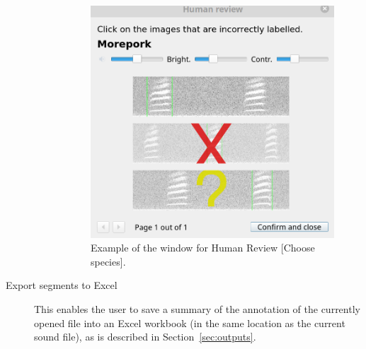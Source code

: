 \documentclass{article}
\begin{document}
\begin{description}
\begin{description}
	\begin{figure}
	\centering
	\includegraphics[width=.4\textwidth]{Figs/singlespecies}
	\caption{Example of the window for Human Review [Choose species].}
	\label{check2}
	\end{figure}
	\end{description}

\item [Export segments to Excel] This enables the user to save a summary of the annotation of the currently opened file into an Excel workbook (in the same location as the current sound file), as is described in Section~\ref{sec:outputs}. 


\end{description}
\end{document}
